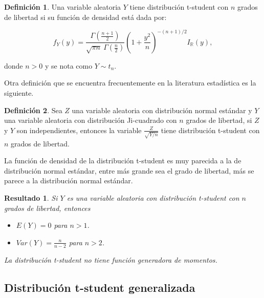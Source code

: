 \documentclass[
  10pt,
  spanish,
]{book}
\providecommand{\tightlist}{%
  \setlength{\itemsep}{0pt}\setlength{\parskip}{0pt}}
\newtheorem{proposition}{Resultado}[chapter]
\theoremstyle{definition}
\newtheorem{definition}{Definición}[chapter]
\theoremstyle{definition}
\theoremstyle{definition}
\theoremstyle{definition}
\theoremstyle{remark}
\begin{document}
\begin{definition}
\protect\hypertarget{def:unnamed-chunk-43}{}{\label{def:unnamed-chunk-43} }Una variable aleatoria \(Y\) tiene distribución t-student con \(n\) grados de libertad si su función de densidad está dada por:

\begin{equation}
f_Y(y)=\frac{\Gamma(\frac{n+1}{2})}{\sqrt{\pi n}\ \Gamma(\frac{n}{2})}\left(1+\frac{y^2}{n}\right)^{-(n+1)/2}I_\mathbb{R}(y),
\end{equation}

donde \(n>0\) y se nota como \(Y\sim t_n\).
\end{definition}

Otra definición que se encuentra frecuentemente en la literatura estadística es la siguiente.

\begin{definition}
\protect\hypertarget{def:unnamed-chunk-44}{}{\label{def:unnamed-chunk-44} }Sea \(Z\) una variable aleatoria con distribución normal estándar y \(Y\) una variable aleatoria con distribución Ji-cuadrado con \(n\) grados de libertad, si \(Z\) y \(Y\) son independientes, entonces la variable \(\frac{Z}{\sqrt{Y/n}}\) tiene distribución t-student con \(n\) grados de libertad.
\end{definition}

La función de densidad de la distribución t-student es muy parecida a la de distribución normal estándar, entre más grande sea el grado de libertad, más se parece a la distribución normal estándar.

\begin{proposition}
\protect\hypertarget{prp:unnamed-chunk-45}{}{\label{prp:unnamed-chunk-45} }Si \(Y\) es una variable aleatoria con distribución t-student con \(n\) grados de libertad, entonces

\begin{itemize}
\tightlist
\item
  \(E(Y)=0\) para \(n>1\).
\item
  \(Var(Y)=\frac{n}{n-2}\) para \(n>2\).
\end{itemize}

La distribución t-student no tiene función generadora de momentos.
\end{proposition}

\hypertarget{distribuciuxf3n-t-student-generalizada}{%
\subsection{Distribución t-student generalizada}\label{distribuciuxf3n-t-student-generalizada}}
\end{document}

